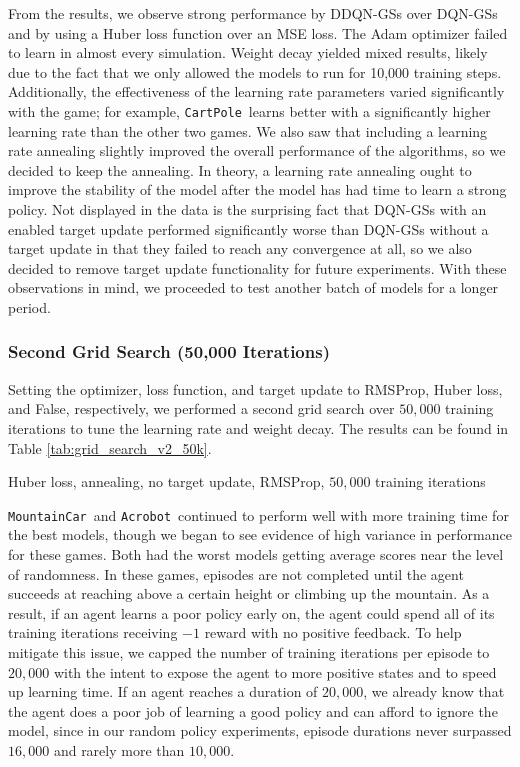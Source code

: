 \documentclass[11pt]{article}
\newcommand{\cp}{\texttt{CartPole}}
\newcommand{\ab}{\texttt{Acrobot}}
\newcommand{\mc}{\texttt{MountainCar}}
\begin{document}
From the results, we observe strong performance by DDQN-GSs over DQN-GSs and by using a Huber loss function over an MSE loss. The Adam optimizer failed to learn in almost every simulation. Weight decay yielded mixed results, likely due to the fact that we only allowed the models to run for 10,000 training steps. Additionally, the effectiveness of the learning rate parameters varied significantly with the game; for example, \cp~learns better with a significantly higher learning rate than the other two games. We also saw that including a learning rate annealing slightly improved the overall performance of the algorithms, so we decided to keep the annealing. In theory, a learning rate annealing ought to improve the stability of the model after the model has had time to learn a strong policy. Not displayed in the data is the surprising fact that DQN-GSs with an enabled target update performed significantly worse than DQN-GSs without a target update in that they failed to reach any convergence at all, so we also decided to remove target update functionality for future experiments. With these observations in mind, we proceeded to test another batch of models for a longer period. 

\subsubsection{Second Grid Search (50,000 Iterations)}
 
Setting the optimizer, loss function, and target update to RMSProp, Huber loss, and False, respectively, we performed a second grid search over $50,000$ training iterations to tune the learning rate and weight decay. The results can be found in Table \ref{tab:grid_search_v2_50k}.

\begin{table}[!htbp]
  \footnotesize
  \centering
  
  
  \caption{Huber loss, annealing, no target update, RMSProp, $50,000$ training iterations}
  \label{tab:grid_search_v2_50k}
\end{table}

\mc~and \ab~continued to perform well with more training time for the best models, though we began to see evidence of high variance in performance for these games. Both had the worst models getting average scores near the level of randomness. In these games, episodes are not completed until the agent succeeds at reaching above a certain height or climbing up the mountain. As a result, if an agent learns a poor policy early on, the agent could spend all of its training iterations receiving $-1$ reward with no positive feedback. To help mitigate this issue, we capped the number of training iterations per episode to $20,000$ with the intent to expose the agent to more positive states and to speed up learning time. If an agent reaches a duration of $20,000$, we already know that the agent does a poor job of learning a good policy and can afford to ignore the model, since in our random policy experiments, episode durations never surpassed $16,000$ and rarely more than $10,000$.
\end{document}
